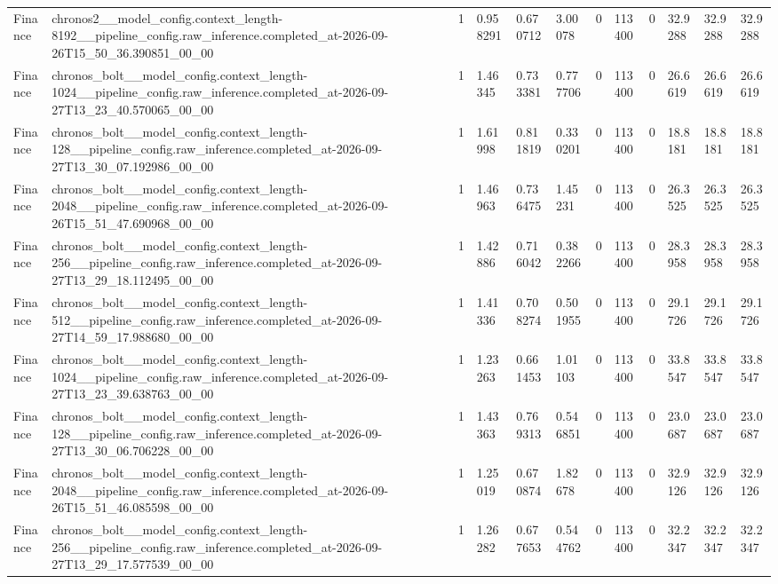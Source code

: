 \begin{tabular}{llllllllllll}
Finance & chronos2\_\_model\_config.context\_length-8192\_\_pipeline\_config.raw\_inference.completed\_at-2026-09-26T15\_50\_36.390851\_00\_00 & 1 & 0.958291 & 0.670712 & 3.00078 & 0 & 113400 & 0 & 32.9288 & 32.9288 & 32.9288 \\
Finance & chronos\_bolt\_\_model\_config.context\_length-1024\_\_pipeline\_config.raw\_inference.completed\_at-2026-09-27T13\_23\_40.570065\_00\_00 & 1 & 1.46345 & 0.733381 & 0.777706 & 0 & 113400 & 0 & 26.6619 & 26.6619 & 26.6619 \\
Finance & chronos\_bolt\_\_model\_config.context\_length-128\_\_pipeline\_config.raw\_inference.completed\_at-2026-09-27T13\_30\_07.192986\_00\_00 & 1 & 1.61998 & 0.811819 & 0.330201 & 0 & 113400 & 0 & 18.8181 & 18.8181 & 18.8181 \\
Finance & chronos\_bolt\_\_model\_config.context\_length-2048\_\_pipeline\_config.raw\_inference.completed\_at-2026-09-26T15\_51\_47.690968\_00\_00 & 1 & 1.46963 & 0.736475 & 1.45231 & 0 & 113400 & 0 & 26.3525 & 26.3525 & 26.3525 \\
Finance & chronos\_bolt\_\_model\_config.context\_length-256\_\_pipeline\_config.raw\_inference.completed\_at-2026-09-27T13\_29\_18.112495\_00\_00 & 1 & 1.42886 & 0.716042 & 0.382266 & 0 & 113400 & 0 & 28.3958 & 28.3958 & 28.3958 \\
Finance & chronos\_bolt\_\_model\_config.context\_length-512\_\_pipeline\_config.raw\_inference.completed\_at-2026-09-27T14\_59\_17.988680\_00\_00 & 1 & 1.41336 & 0.708274 & 0.501955 & 0 & 113400 & 0 & 29.1726 & 29.1726 & 29.1726 \\
Finance & chronos\_bolt\_\_model\_config.context\_length-1024\_\_pipeline\_config.raw\_inference.completed\_at-2026-09-27T13\_23\_39.638763\_00\_00 & 1 & 1.23263 & 0.661453 & 1.01103 & 0 & 113400 & 0 & 33.8547 & 33.8547 & 33.8547 \\
Finance & chronos\_bolt\_\_model\_config.context\_length-128\_\_pipeline\_config.raw\_inference.completed\_at-2026-09-27T13\_30\_06.706228\_00\_00 & 1 & 1.43363 & 0.769313 & 0.546851 & 0 & 113400 & 0 & 23.0687 & 23.0687 & 23.0687 \\
Finance & chronos\_bolt\_\_model\_config.context\_length-2048\_\_pipeline\_config.raw\_inference.completed\_at-2026-09-26T15\_51\_46.085598\_00\_00 & 1 & 1.25019 & 0.670874 & 1.82678 & 0 & 113400 & 0 & 32.9126 & 32.9126 & 32.9126 \\
Finance & chronos\_bolt\_\_model\_config.context\_length-256\_\_pipeline\_config.raw\_inference.completed\_at-2026-09-27T13\_29\_17.577539\_00\_00 & 1 & 1.26282 & 0.677653 & 0.544762 & 0 & 113400 & 0 & 32.2347 & 32.2347 & 32.2347 \\

\end{tabular}
